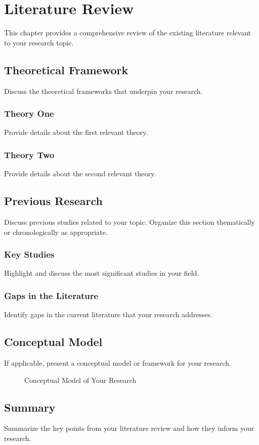 \chapter{Literature Review}

This chapter provides a comprehensive review of the existing literature relevant to your research topic.

\section{Theoretical Framework}

Discuss the theoretical frameworks that underpin your research.

\subsection{Theory One}

Provide details about the first relevant theory.

\subsection{Theory Two}

Provide details about the second relevant theory.

\section{Previous Research}

Discuss previous studies related to your topic. Organize this section thematically or chronologically as appropriate.

\subsection{Key Studies}

Highlight and discuss the most significant studies in your field.

\subsection{Gaps in the Literature}

Identify gaps in the current literature that your research addresses.

\section{Conceptual Model}

If applicable, present a conceptual model or framework for your research.

\begin{figure}[H]
\centering
\caption{Conceptual Model of Your Research}
\label{fig:conceptual}
\end{figure}

\section{Summary}

Summarize the key points from your literature review and how they inform your research.

\newpage